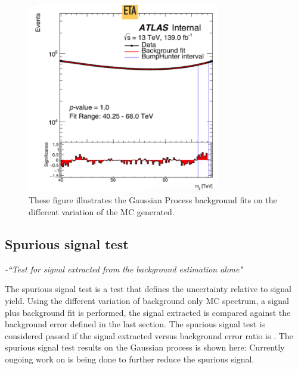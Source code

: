 \begin{itemize}
\begin{figure}[!htb]
\begin{center}
        \includegraphics[width=0.75\textwidth]{figures/chapter_dimuon/EtaVariation}
        \caption{
        These figure illustrates the Gaussian Process background fits on the different variation of the MC generated. }
    \end{center}
\end{figure}

\subsection{Spurious signal test}
\textit{-``Test for signal extracted from the background estimation alone"}

The spurious signal test is a test that defines the uncertainty relative to signal yield. 
Using the different variation of background only MC spectrum, a signal plus background fit is performed, the signal extracted is compared against the background error defined in the last section. The spurious signal test is considered passed if the signal extracted versus background error ratio is .
The spurious signal test results on the Gaussian process is shown here:
Currently ongoing work on is being done to further reduce the spurious signal.


\end{itemize}
